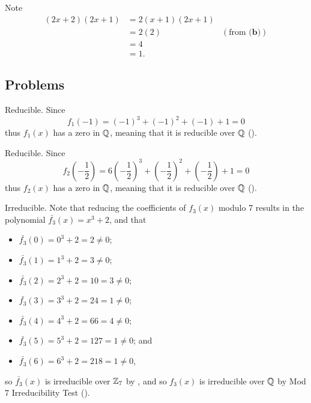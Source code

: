 \begin{questions}
\begin{partquestions}{\alph*}
        \item Note
        \begin{align*}
            (2x+2)(2x+1) &= 2(x+1)(2x+1)\\
            &= 2(2) & (\text{from }\textbf{(b)})\\
            &= 4\\
            &= 1.
        \end{align*}
    \end{partquestions}
\end{questions}

\subsection*{Problems}
\begin{questions}
    \item \begin{partquestions}{\alph*}
        \item Reducible. Since
        \[
            f_1(-1) = (-1)^3 + (-1)^2 + (-1) + 1 = 0
        \]
        thus $f_1(x)$ has a zero in $\mathbb{Q}$, meaning that it is reducible over $\mathbb{Q}$ ().

        \item Reducible. Since
        \[
            f_2\left(-\frac12\right) = 6\left(-\frac12\right)^3 + \left(-\frac12\right)^2 + \left(-\frac12\right) + 1 = 0
        \]
        thus $f_2(x)$ has a zero in $\mathbb{Q}$, meaning that it is reducible over $\mathbb{Q}$ ().

        \item Irreducible. Note that reducing the coefficients of $f_3(x)$ modulo 7 results in the polynomial $\bar{f_3}(x) = x^3 + 2$, and that
        \begin{itemize}
            \item $\bar{f_3}(0) = 0^3 + 2 = 2 \neq 0$;
            \item $\bar{f_3}(1) = 1^3 + 2 = 3 \neq 0$;
            \item $\bar{f_3}(2) = 2^3 + 2 = 10 = 3 \neq 0$;
            \item $\bar{f_3}(3) = 3^3 + 2 = 24 = 1 \neq 0$;
            \item $\bar{f_3}(4) = 4^3 + 2 = 66 = 4 \neq 0$;
            \item $\bar{f_3}(5) = 5^3 + 2 = 127 = 1 \neq 0$; and
            \item $\bar{f_3}(6) = 6^3 + 2 = 218 = 1 \neq 0$,
        \end{itemize}
        so $\bar{f_3}(x)$ is irreducible over $\mathbb{Z}_7$ by , and so $f_3(x)$ is irreducible over $\mathbb{Q}$ by Mod 7 Irreducibility Test ().


\end{partquestions}
\end{questions}
